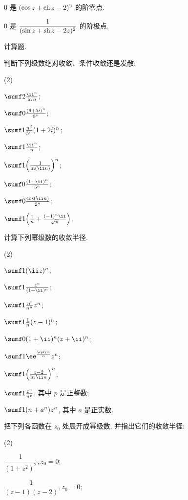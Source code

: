\begin{homework}
\begin{subex}
    \item $0$ 是 $(\cos z+\operatorname{ch} z-2)^2$ 的\fillblank{}阶零点.
    \item $0$ 是 $\dfrac1{(\sin z+\operatorname{sh} z-2z)^2}$ 的\fillblank{}阶极点.
  \end{subex}
  \item 计算题.
  \begin{subex}
    \item 判断下列级数绝对收敛、条件收敛还是发散:
      \begin{subsubex}(2)
        \item $\sumf2 \frac{\ii ^n}{\ln n}$;
        \item $\sumf0 \frac{(6+5i)^n}{8^n}$;
        \item $\sumf1 \frac{n^2}{5^n}(1+2i)^n$;
        \item $\sumf1 \frac{\ii ^n}{n}$;
        \item $\sumf1 \Bigl(\frac{1}{\ln (\ii n)}\Bigr)^n$;
        \item $\sumf0 \frac{(1+\ii)^n}{5^n}$;
        \item $\sumf0 \frac{\cos(\ii n)}{2^n}$;
        \item $\sumf1 \Bigl(\frac1n+\frac{(-1)^n\ii}{\sqrt n}\Bigr)$.
      \end{subsubex}
    \item 计算下列幂级数的收敛半径.
    \begin{subsubex}(2)
      \item $\sumf1 (\ii z)^n$;
      \item $\sumf1 \frac{z^n}{(1+\ii)^n}$;
      \item $\sumf1 \frac{n!}{n^n}z^n$;
      \item $\sumf1 \frac1n(z-1)^n$;
      \item $\sumf0 (1+\ii)^n(z+\ii)^n$;
      \item $\sumf1 \ee^{\frac{\cpi\ii}n}z^n$;
      \item $\sumf1 \Bigl(\frac{z-2}{\ln{\ii n}}\Bigr)^n$;
      \item $\sumf1 \frac{z^n}{n^p}$, 其中 $p$ 是正整数;
      \item $\sumf1 (n+a^n)z^n$, 其中 $a$ 是正实数.
    \end{subsubex}
    \item 把下列各函数在 $z_0$ 处展开成幂级数, 并指出它们的收敛半径:
    \begin{subsubex}(2)
      \item $\dfrac1{(1+z^2)^2}, z_0=0$;
      \item $\dfrac{1}{(z-1)(z-2)}, z_0=0$;

\end{subsubex}
\end{subex}
\end{homework}
